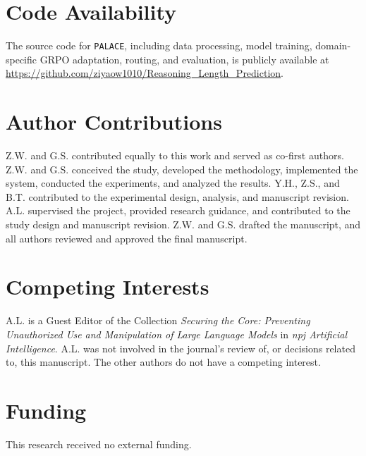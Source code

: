 \documentclass[pdflatex,sn-mathphys-num]{sn-jnl}%
\newcommand{\n}{\texttt{PALACE}\xspace}
\theoremstyle{thmstyleone}%
\theoremstyle{thmstyletwo}%
\theoremstyle{thmstylethree}%
\begin{document}
\section*{Code Availability}

The source code for {\n}, including data processing, model training, domain-specific GRPO adaptation, routing, and evaluation, is publicly available at \url{https://github.com/ziyaow1010/Reasoning_Length_Prediction}.

\section*{Author Contributions}

Z.W. and G.S. contributed equally to this work and served as co-first authors. 
Z.W. and G.S. conceived the study, developed the methodology, implemented the system, conducted the experiments, and analyzed the results. 
Y.H., Z.S., and B.T. contributed to the experimental design, analysis, and manuscript revision. 
A.L. supervised the project, provided research guidance, and contributed to the study design and manuscript revision. 
Z.W. and G.S. drafted the manuscript, and all authors reviewed and approved the final manuscript.

\section*{Competing Interests}

A.L. is a Guest Editor of the Collection \emph{Securing the Core: Preventing Unauthorized Use and Manipulation of Large Language Models} in \emph{npj Artificial Intelligence}. A.L. was not involved in the journal's review of, or decisions related to, this manuscript. The other authors do not have a competing interest.

\section*{Funding}

This research received no external funding.


\end{document}
